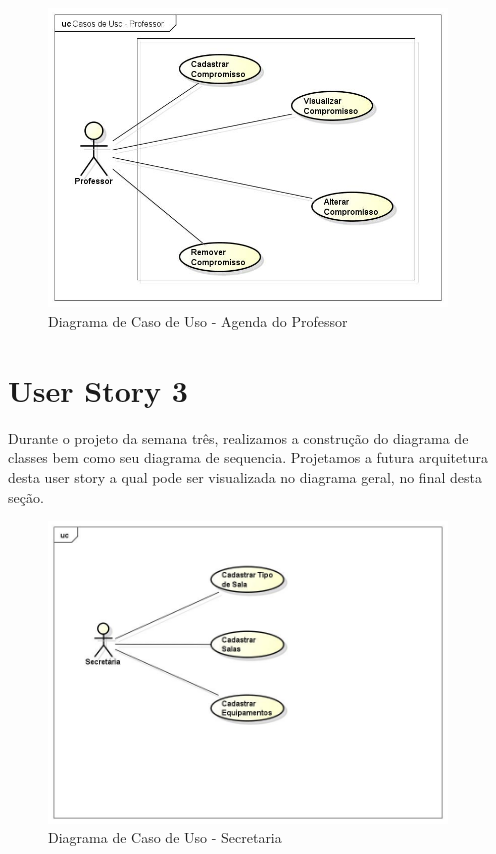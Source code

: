 \documentclass{abnt}
\begin{document}
		\begin{figure}[h]
			\begin{center}
				 \includegraphics[width=400px]{casoUsoProfessor}
				 \caption{Diagrama de Caso de Uso - Agenda do Professor}
				 \label{fig:casoUsoAgendaProfessor}
			\end{center}
		\end{figure}
		\FloatBarrier
	\clearpage
	\section{User Story 3}
	
	Durante o projeto da semana três, realizamos a construção do diagrama de classes bem como seu diagrama de sequencia.
	Projetamos a futura arquitetura desta user story a qual pode ser visualizada no diagrama geral, no final desta seção. 
	
		\begin{figure}[h]
			\begin{center}
				 \includegraphics[width=400px]{casoUsoSecretaria}
				 \caption{Diagrama de Caso de Uso - Secretaria}
				 \label{fig:casoUsoSecretaria}
			\end{center}
		\end{figure}
		\FloatBarrier
	\clearpage
\end{document}

